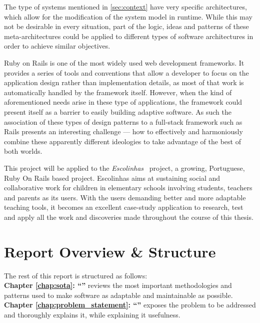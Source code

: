 The type of systems mentioned in \ref{sec:context} have very specific architectures, which allow for the modification of the system model in runtime. While this may not be desirable in every situation, part of the logic, ideas and patterns of these meta-architectures could be applied to different types of software architectures in order to achieve similar objectives.

Ruby on Rails is one of the most widely used web development frameworks. It provides a series of tools and conventions that allow a developer to focus on the application design rather than implementation details, as most of that work is automatically handled by the framework itself. However, when the kind of aforementioned needs arise in these type of applications, the framework could present itself as a barrier to easily building adaptive software. As such the association of these types of design patterns to a full-stack framework such as Rails presents an interesting challenge --- how to effectively and harmoniously combine these apparently different ideologies to take advantage of the best of both worlds.

This project will be applied to the \textit{Escolinhas}~\cite{escolinhas} project, a growing, Portuguese, Ruby On Rails based project. Escolinhas aims at sustaining social and collaborative work for children in elementary schools involving students, teachers and parents as its users. With the users demanding better and more adaptable teaching tools, it becomes an excellent case-study application to research, test and apply all the work and discoveries made throughout the course of this thesis.

\section{Report Overview \& Structure}\label{sec:structure}

The rest of this report is structured as follows:\\

\textbf{Chapter \ref{chap:sota}: ``'' } reviews the most important methodologies and patterns used to make software as adaptable and maintainable as possible.\\

\textbf{Chapter \ref{chap:problem_statement}: ``'' } exposes the problem to be addressed and thoroughly explains it, while explaining it usefulness.\\

